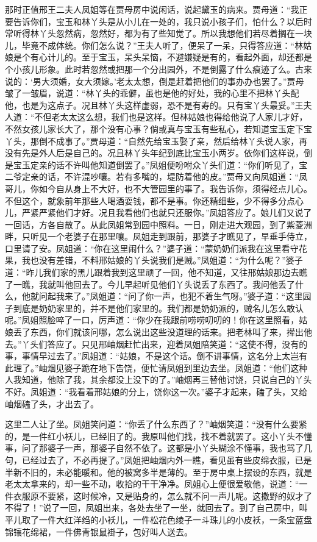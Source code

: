 \begin{parag}
    那时正值邢王二夫人凤姐等在贾母房中说闲话，说起黛玉的病来。贾母道：“我正要告诉你们，宝玉和林丫头是从小儿在一处的，我只说小孩子们，怕什么？以后时常听得林丫头忽然病，忽然好，都为有了些知觉了。所以我想他们若尽着搁在一块儿，毕竟不成体统。你们怎么说？”王夫人听了，便呆了一呆，只得答应道：“林姑娘是个有心计儿的。至于宝玉，呆头呆恼，不避嫌疑是有的，看起外面，却还都是个小孩儿形象。此时若忽然或把那一个分出园外，不是倒露了什么痕迹了么。古来说的：‘男大须婚，女大须嫁。’老太太想，倒是赶着把他们的事办办也罢了。”贾母皱了一皱眉，说道：“林丫头的乖僻，虽也是他的好处，我的心里不把林丫头配他，也是为这点子。况且林丫头这样虚弱，恐不是有寿的。只有宝丫头最妥。”王夫人道：“不但老太太这么想，我们也是这样。但林姑娘也得给他说了人家儿才好，不然女孩儿家长大了，那个没有心事？倘或真与宝玉有些私心，若知道宝玉定下宝丫头，那倒不成事了。”贾母道：“自然先给宝玉娶了亲，然后给林丫头说人家，再没有先是外人后是自己的。况且林丫头年纪到底比宝玉小两岁。依你们这样说，倒是宝玉定亲的话不许叫他知道倒罢了。”凤姐便吩咐众丫头们道：“你们听见了，宝二爷定亲的话，不许混吵嚷。若有多嘴的，堤防着他的皮。”贾母又向凤姐道：“凤哥儿，你如今自从身上不大好，也不大管园里的事了。我告诉你，须得经点儿心。不但这个，就象前年那些人喝酒耍钱，都不是事。你还精细些，少不得多分点心儿，严紧严紧他们才好。况且我看他们也就只还服你。”凤姐答应了。娘儿们又说了一回话，方各自散了。从此凤姐常到园中照料。一日，刚走进大观园，到了紫菱洲畔，只听见一个老婆子在那里嚷。凤姐走到跟前，那婆子才瞧见了，早垂手侍立，口里请了安。凤姐道：“你在这里闹什么？”婆子道：“蒙奶奶们派我在这里看守花果，我也没有差错，不料邢姑娘的丫头说我们是贼。”凤姐道：“为什么呢？”婆子道：“昨儿我们家的黑儿跟着我到这里顽了一回，他不知道，又往邢姑娘那边去瞧了一瞧，我就叫他回去了。今儿早起听见他们丫头说丢了东西了。我问他丢了什么，他就问起我来了。”凤姐道：“问了你一声，也犯不着生气呀。”婆子道：“这里园子到底是奶奶家里的，并不是他们家里的。我们都是奶奶派的，贼名儿怎么敢认呢。”凤姐照脸啐了一口，厉声道：“你少在我跟前唠唠叨叨的！你在这里照看，姑娘丢了东西，你们就该问哪，怎么说出这些没道理的话来。把老林叫了来，撵出他去。”丫头们答应了。只见邢岫烟赶忙出来，迎着凤姐陪笑道：“这使不得，没有的事，事情早过去了。”凤姐道：“姑娘，不是这个话。倒不讲事情，这名分上太岂有此理了。”岫烟见婆子跪在地下告饶，便忙请凤姐到里边去坐。凤姐道：“他们这种人我知道，他除了我，其余都没上没下的了。”岫烟再三替他讨饶，只说自己的丫头不好。凤姐道：“我看着邢姑娘的分上，饶你这一次。”婆子才起来，磕了头，又给岫烟磕了头，才出去了。
\end{parag}


\begin{parag}
    这里二人让了坐。凤姐笑问道：“你丢了什么东西了？”岫烟笑道：“没有什么要紧的，是一件红小袄儿，已经旧了的。我原叫他们找，找不着就罢了。这小丫头不懂事，问了那婆子一声，那婆子自然不依了。这都是小丫头糊涂不懂事，我也骂了几句，已经过去了，不必再提了。”凤姐把岫烟内外一瞧，看见虽有些皮绵衣服，已是半新不旧的，未必能暖和。他的被窝多半是薄的。至于房中桌上摆设的东西，就是老太太拿来的，却一些不动，收拾的干干净净。凤姐心上便很爱敬他，说道：“一件衣服原不要紧，这时候冷，又是贴身的，怎么就不问一声儿呢。这撒野的奴才了不得了！”说了一回，凤姐出来，各处去坐了一坐，就回去了。到了自己房中，叫平儿取了一件大红洋绉的小袄儿，一件松花色绫子一斗珠儿的小皮袄，一条宝蓝盘锦镶花绵裙，一件佛青银鼠褂子，包好叫人送去。
\end{parag}



